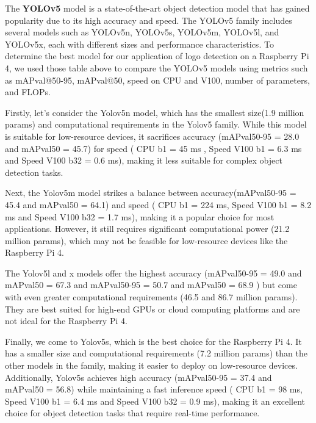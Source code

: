 \begin{itemize}
\FloatBarrier

The \textbf{YOLOv5} model is a state-of-the-art object detection model that has gained popularity due to its high accuracy and speed. The YOLOv5 family includes several models such as YOLOv5n, YOLOv5s, YOLOv5m, YOLOv5l, and YOLOv5x, each with different sizes and performance characteristics. To determine the best model for our application of logo detection on a Raspberry Pi 4, we used those table above to compare the YOLOv5 models using metrics such as mAPval@50-95, mAPval@50, speed on CPU and V100, number of parameters, and FLOPs.

Firstly, let's consider the Yolov5n model, which has the smallest size(1.9 million params) and computational requirements in the Yolov5 family. While this model is suitable for low-resource devices, it sacrifices accuracy (mAPval50-95 = 28.0 and mAPval50 =  45.7) for speed ( CPU b1 = 45 ms  , Speed V100 b1 = 6.3 ms and Speed V100 b32 = 	0.6 ms), making it less suitable for complex object detection tasks.

Next, the Yolov5m model strikes a balance between accuracy(mAPval50-95 = 45.4 and mAPval50 =  64.1) and speed ( CPU b1 = 224 ms, Speed V100 b1 = 8.2 ms and Speed V100 b32 = 1.7 ms), making it a popular choice for most applications. However, it still requires significant computational power (21.2 million params), which may not be feasible for low-resource devices like the Raspberry Pi 4.

The Yolov5l and x models offer the highest accuracy (mAPval50-95 = 49.0 and mAPval50 =  67.3 and mAPval50-95 = 50.7 and mAPval50 =  68.9 ) but come with even greater computational requirements (46.5 and 86.7 million params). They are best suited for high-end GPUs or cloud computing platforms and are not ideal for the Raspberry Pi 4.

Finally, we come to Yolov5s, which is the best choice for the Raspberry Pi 4. It has a smaller size and computational requirements (7.2 million params) than the other models in the family, making it easier to deploy on low-resource devices. Additionally, Yolov5s achieves high accuracy (mAPval50-95 = 37.4 and mAPval50 =  56.8) while maintaining a fast inference speed ( CPU b1 = 98 ms, Speed V100 b1 = 6.4 ms and Speed V100 b32 = 0.9 ms), making it an excellent choice for object detection tasks that require real-time performance.


\end{itemize}

